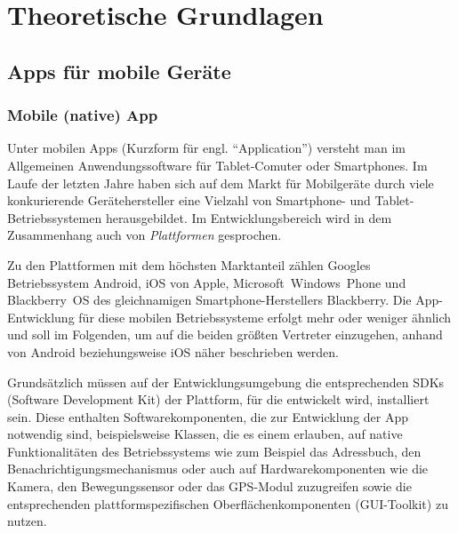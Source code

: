 \chapter{Theoretische Grundlagen}

\section{Apps für mobile Geräte} %

\subsection{Mobile (native) App} \label{native}
Unter mobilen Apps (Kurzform für engl. \enquote{Application}) versteht man im Allgemeinen Anwendungssoftware für Tablet-Comuter oder Smartphones. 
Im Laufe der letzten Jahre haben sich auf dem Markt für Mobilgeräte durch viele konkurierende Gerätehersteller eine Vielzahl von Smartphone- und Tablet-Betriebssystemen herausgebildet. 
Im Entwicklungsbereich wird in dem Zusammenhang auch von \emph{Plattformen} gesprochen.

Zu den Plattformen mit dem höchsten Marktanteil zählen Googles Betriebssystem Android, iOS von Apple, Microsoft~Windows~Phone und Blackberry~OS des gleichnamigen Smartphone-Herstellers Blackberry.\cite{platforms-marketshare}
Die App-Entwicklung für diese mobilen Betriebssysteme erfolgt mehr oder weniger ähnlich und soll im Folgenden, um auf die beiden größten Vertreter einzugehen, anhand von Android beziehungsweise iOS näher beschrieben werden.

Grundsätzlich müssen auf der Entwicklungsumgebung die entsprechenden SDKs (Software Development Kit) der Plattform, für die entwickelt wird, installiert sein. 
Diese enthalten Softwarekomponenten, die zur Entwicklung der App notwendig sind, beispielsweise Klassen, die es einem erlauben, auf native Funktionalitäten des Betriebssystems wie zum Beispiel das Adressbuch, den Benachrichtigungsmechanismus oder auch auf Hardwarekomponenten wie die Kamera, den Bewegungssensor oder das GPS-Modul zuzugreifen sowie die entsprechenden plattformspezifischen Oberflächenkomponenten (GUI-Toolkit) zu nutzen.

